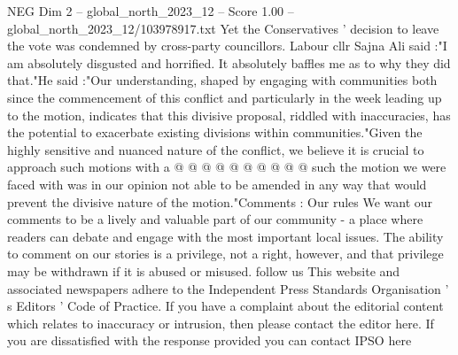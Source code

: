 \begin{textsample}{NEG Dim 2 – global\_north\_2023\_12 – Score 1.00 – global\_north\_2023\_12/103978917.txt}
Yet the Conservatives ' decision to leave the vote was condemned by cross-party councillors.
Labour cllr Sajna Ali said :"I am absolutely disgusted and horrified.
It absolutely baffles me as to why they did that."He said :"Our understanding, shaped by engaging with communities both since the commencement of this conflict and particularly in the week leading up to the motion, indicates that this divisive proposal, riddled with inaccuracies, has the potential to exacerbate existing divisions within communities."Given the highly sensitive and nuanced nature of the conflict, we believe it is crucial to approach such motions with a @ @ @ @ @ @ @ @ @ @ such the motion we were faced with was in our opinion not able to be amended in any way that would prevent the divisive nature of the motion."Comments : Our rules We want our comments to be a lively and valuable part of our community - a place where readers can debate and engage with the most important local issues.
The ability to comment on our stories is a privilege, not a right, however, and that privilege may be withdrawn if it is abused or misused. follow us This website and associated newspapers adhere to the Independent Press Standards Organisation ' s Editors ' Code of Practice.
If you have a complaint about the editorial content which relates to inaccuracy or intrusion, then please contact the editor here.
If you are dissatisfied with the response provided you can contact IPSO here

\end{textsample}
